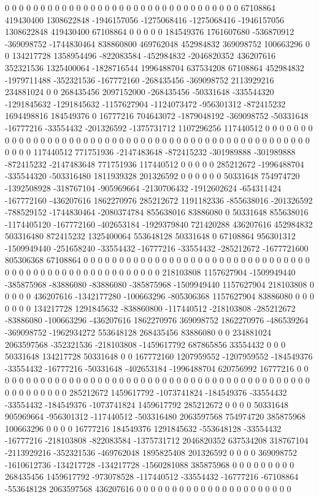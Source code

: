 0 0 0 0 0 0 0 0 0 0 0 0 0 0 0 0 0 0 0 0 0 0 0 0 0 0 0 0 0 0 0 0 0 67108864 419430400 1308622848 -1946157056 -1275068416 -1275068416 -1946157056 1308622848 419430400 67108864 0 0 0 0 0 184549376 1761607680 -536870912 -369098752 -1744830464 838860800 469762048 452984832 369098752 100663296 0 0 134217728 1358954496 -822083584 -452984832 -2046820352 436207616 352321536 1325400064 -1828716544 1996488704 637534208 67108864 452984832 -1979711488 -352321536 -167772160 -268435456 -369098752 2113929216 234881024 0 0 268435456 2097152000 -268435456 -50331648 -335544320 -1291845632 -1291845632 -1157627904 -1124073472 -956301312 -872415232 1694498816 184549376 0 16777216 704643072 -1879048192 -369098752 -50331648 -16777216 -33554432 -201326592 -1375731712 1107296256 117440512 0 0 0 0 0 0 0 0 0 0 0 0 0 0 0 0 0 0 0 0 0
0 0 0 0 0 0 0 0 0 0 0 0 0 0 0 0 0 0 0 0 0 0 0 0 0 0 0 0 0 0 0 0 0 117440512 771751936 -2147483648 -872415232 -301989888 -301989888 -872415232 -2147483648 771751936 117440512 0 0 0 0 0 285212672 -1996488704 -335544320 -503316480 1811939328 201326592 0 0 0 0 0 0 50331648 754974720 -1392508928 -318767104 -905969664 -2130706432 -1912602624 -654311424 -167772160 -436207616 1862270976 285212672 1191182336 -855638016 -201326592 -788529152 -1744830464 -2080374784 855638016 83886080 0 50331648 855638016 -1174405120 -167772160 -402653184 -1929379840 721420288 436207616 452984832 503316480 872415232 1325400064 553648128 50331648 0 67108864 956301312 -1509949440 -251658240 -33554432 -16777216 -33554432 -285212672 -1677721600 805306368 67108864 0 0 0 0 0 0 0 0 0 0 0 0 0 0 0 0 0 0 0 0 0
0 0 0 0 0 0 0 0 0 0 0 0 0 0 0 0 0 0 0 0 0 0 0 0 0 0 0 0 0 0 0 0 0 218103808 1157627904 -1509949440 -385875968 -83886080 -83886080 -385875968 -1509949440 1157627904 218103808 0 0 0 0 0 436207616 -1342177280 -100663296 -805306368 1157627904 83886080 0 0 0 0 0 0 0 134217728 1291845632 -838860800 -117440512 -218103808 -285212672 -83886080 -100663296 -436207616 1862270976 369098752 1862270976 -486539264 -369098752 -1962934272 553648128 268435456 83886080 0 0 234881024 2063597568 -352321536 -218103808 -1459617792 687865856 33554432 0 0 0 50331648 134217728 50331648 0 0 167772160 1207959552 -1207959552 -184549376 -33554432 -16777216 -50331648 -402653184 -1996488704 620756992 16777216 0 0 0 0 0 0 0 0 0 0 0 0 0 0 0 0 0 0 0 0 0
0 0 0 0 0 0 0 0 0 0 0 0 0 0 0 0 0 0 0 0 0 0 0 0 0 0 0 0 0 0 0 0 0 285212672 1459617792 -1073741824 -184549376 -33554432 -33554432 -184549376 -1073741824 1459617792 285212672 0 0 0 0 50331648 905969664 -956301312 -117440512 -503316480 2063597568 754974720 385875968 100663296 0 0 0 0 16777216 184549376 1291845632 -553648128 -33554432 -16777216 -218103808 -822083584 -1375731712 2046820352 637534208 318767104 -2113929216 -352321536 -469762048 1895825408 201326592 0 0 0 0 369098752 -1610612736 -134217728 -134217728 -1560281088 385875968 0 0 0 0 0 0 0 0 0 268435456 1459617792 -973078528 -117440512 -33554432 -16777216 -67108864 -553648128 2063597568 436207616 0 0 0 0 0 0 0 0 0 0 0 0 0 0 0 0 0 0 0 0 0 0

